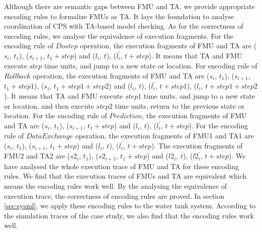 Although there are semantic gaps between FMU and TA, we provide appropriate encoding rules to formalize FMUs as TA. It lays the foundation to analyse coordination of CPS with TA-based model checking. 
As for the correctness of encoding rules, we analyse the equivalence of execution fragments. For the encoding rule of $Dostep$ operation, the execution fragments of FMU and TA are ($s_{i}$, $t_{1}$), ($s_{i+1}$, $t_{1}+step$) and ($l_{i}$, $t$), ($l_{i}^{\prime}$, $t+step$). It means that TA and FMU execute $step$ time units, and jump to a new state or location. For encoding rule of $Rollback$ operation, the execution fragments of FMU and TA are ($s_{i}$, $t_{1}$), ($s_{i+1}$, $t_{1}+step1$), ($s_{i}$, $t_{1}+step1+step2$) and ($l_{i}$, $t$), ($l_{i}^{\prime}$, $t+step1$), ($l_{i}$, $t+step1+step2$). It means that TA and FMU execute $step1$ time units, and jump to a new state or location, and then execute $step2$ time units, return to the previous state or location. For the encoding rule of $Prediction$, the execution fragments of FMU and TA are ($s_{i}$, $t_{1}$), ($s_{i+1}$, $t_{1}+step$) and ($l_{i}$, $t$), ($l_{i}^{\prime}$, $t+step$). For the encoding rule of $Data Exchange$ operation, the execution fragments of FMU1 and TA1 are ($s_{i}$, $t_{1}$), ($s_{i+1}$, $t_{1}+step$) and ($l_{i}$, $t$), ($l_{i}^{\prime}$, $t+step$). The execution fragments of FMU2 and TA2 are ($s2_{i}$, $t_{1}$), ($s2_{i+1}$, $t_{1}+step$) and ($l2_{i}$, $t$), ($l2_{i}^{\prime}$, $t+step$). We have analysed the whole execution trace of FMU and TA for these encoding rules. We find that the execution traces of FMUs and TA are equivalent which means the encoding rules work well. By the analysing the equivalence of execution trace, the correctness of encoding rules are proved. In section \ref{sec:sysml}, we apply these encoding rules to the water tank system. According to the simulation traces of the case study, we also find that the encoding rules work well.